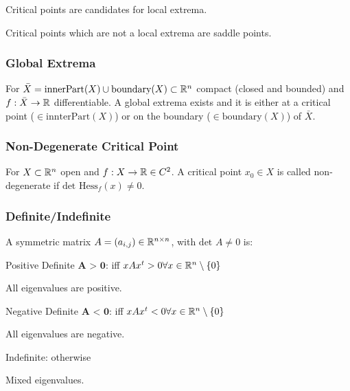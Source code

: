 \begin{compactitem}
    \item Critical points are candidates for local extrema.
    \item Critical points which are not a local extrema are saddle points.
\end{compactitem}

\subsubsection{Global Extrema}
For $\bar{X} = \text{innerPart}(X) \cup \text{boundary}(X) \subset \mathbb{R}^n$ compact (closed and bounded) and $f: \bar{X} \to \mathbb{R}$ differentiable. A global extrema exists and it is either at a critical point ($\in \text{innterPart}(X)$) or on the boundary ($\in \text{boundary}(X)$) of $\bar{X}$.

\subsubsection{Non-Degenerate Critical Point}
For $X \subset \mathbb{R}^n$ open and $f: X \to \mathbb{R} \in C^2$. A critical point $x_0 \in X$ is called non-degenerate if $\text{det }\text{Hess}_f(x) \neq 0$.

\subsubsection{Definite/Indefinite}
A symmetric matrix $A = (a_{i,j}) \in \mathbb{R}^{n \times n}$, with $\text{det } A \neq 0$ is:

\begin{compactdesc}
    \item[Positive Definite $\textbf{A > 0}$:] iff $xAx^t > 0 \forall x \in \mathbb{R}^n \setminus \{0\}$
        \begin{compactitem}
            \item All eigenvalues are positive.
        \end{compactitem}
    \item[Negative Definite $\textbf{A < 0}$:] iff $xAx^t < 0 \forall x \in \mathbb{R}^n \setminus \{0\}$
        \begin{compactitem}
            \item All eigenvalues are negative.
        \end{compactitem}
    \item[Indefinite:] otherwise
        \begin{compactitem}
            \item Mixed eigenvalues.
        \end{compactitem}
\end{compactdesc}

